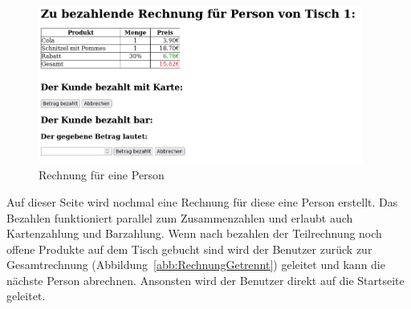 \begin{figure}[htb]
  \centering
  \includegraphics[width=0.95\textwidth]{images/RechnungGetrenntZahlen.png}
  \caption[Rechnung für eine Person]{Rechnung für eine Person}
  \label{abb:RechnungGetrenntZahlen}
\end{figure}

Auf dieser Seite wird nochmal eine Rechnung für diese eine Person erstellt.
Das Bezahlen funktioniert parallel zum Zusammenzahlen und erlaubt auch Kartenzahlung und Barzahlung.
Wenn nach bezahlen der Teilrechnung noch offene Produkte auf dem Tisch gebucht sind wird der Benutzer zurück zur Gesamtrechnung (Abbildung~\ref{abb:RechnungGetrennt}) geleitet und kann die nächste Person abrechnen.
Ansonsten wird der Benutzer direkt auf die Startseite geleitet.



